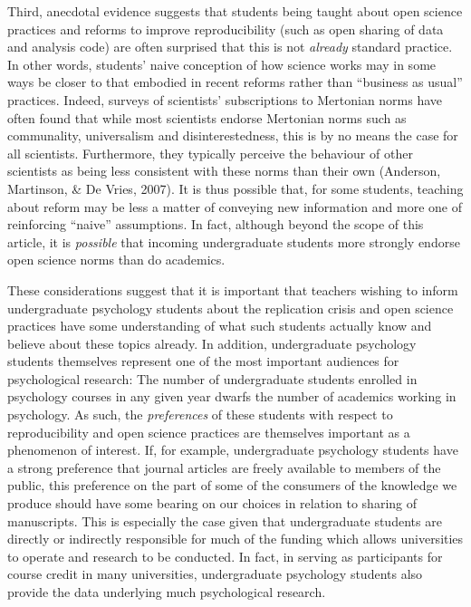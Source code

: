 \documentclass[
  man,mask,floatsintext]{apa6}
\begin{document}
Third, anecdotal evidence suggests that students being taught about open science practices and reforms to improve reproducibility (such as open sharing of data and analysis code) are often surprised that this is not \emph{already} standard practice. In other words, students' naive conception of how science works may in some ways be closer to that embodied in recent reforms rather than ``business as usual'' practices. Indeed, surveys of scientists' subscriptions to Mertonian norms have often found that while most scientists endorse Mertonian norms such as communality, universalism and disinterestedness, this is by no means the case for all scientists. Furthermore, they typically perceive the behaviour of other scientists as being less consistent with these norms than their own (Anderson, Martinson, \& De Vries, 2007). It is thus possible that, for some students, teaching about reform may be less a matter of conveying new information and more one of reinforcing ``naive'' assumptions. In fact, although beyond the scope of this article, it is \emph{possible} that incoming undergraduate students more strongly endorse open science norms than do academics.

These considerations suggest that it is important that teachers wishing to inform undergraduate psychology students about the replication crisis and open science practices have some understanding of what such students actually know and believe about these topics already. In addition, undergraduate psychology students themselves represent one of the most important audiences for psychological research: The number of undergraduate students enrolled in psychology courses in any given year dwarfs the number of academics working in psychology. As such, the \emph{preferences} of these students with respect to reproducibility and open science practices are themselves important as a phenomenon of interest. If, for example, undergraduate psychology students have a strong preference that journal articles are freely available to members of the public, this preference on the part of some of the consumers of the knowledge we produce should have some bearing on our choices in relation to sharing of manuscripts. This is especially the case given that undergraduate students are directly or indirectly responsible for much of the funding which allows universities to operate and research to be conducted. In fact, in serving as participants for course credit in many universities, undergraduate psychology students also provide the data underlying much psychological research.
\end{document}
